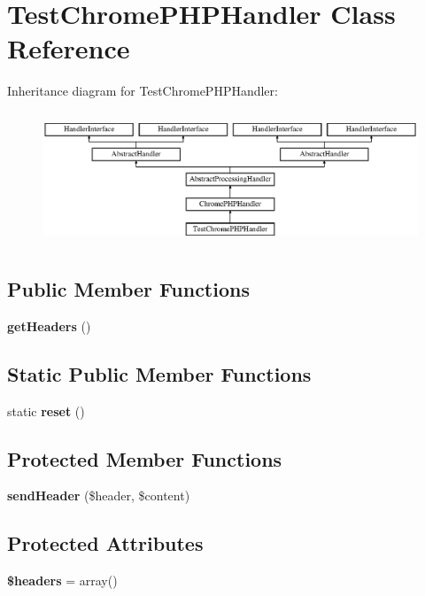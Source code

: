 \section{Test\+Chrome\+P\+H\+P\+Handler Class Reference}
\label{class_monolog_1_1_handler_1_1_test_chrome_p_h_p_handler}
Inheritance diagram for Test\+Chrome\+P\+H\+P\+Handler\+:\begin{figure}[H]
\begin{center}
\leavevmode
\includegraphics[height=4.000000cm]{class_monolog_1_1_handler_1_1_test_chrome_p_h_p_handler}
\end{center}
\end{figure}
\subsection*{Public Member Functions}
\begin{DoxyCompactItemize}
\item 
{\bf get\+Headers} ()
\end{DoxyCompactItemize}
\subsection*{Static Public Member Functions}
\begin{DoxyCompactItemize}
\item 
static {\bf reset} ()
\end{DoxyCompactItemize}
\subsection*{Protected Member Functions}
\begin{DoxyCompactItemize}
\item 
{\bf send\+Header} (\$header, \$content)
\end{DoxyCompactItemize}
\subsection*{Protected Attributes}
\begin{DoxyCompactItemize}
\item 
{\bf \$headers} = array()
\end{DoxyCompactItemize}
